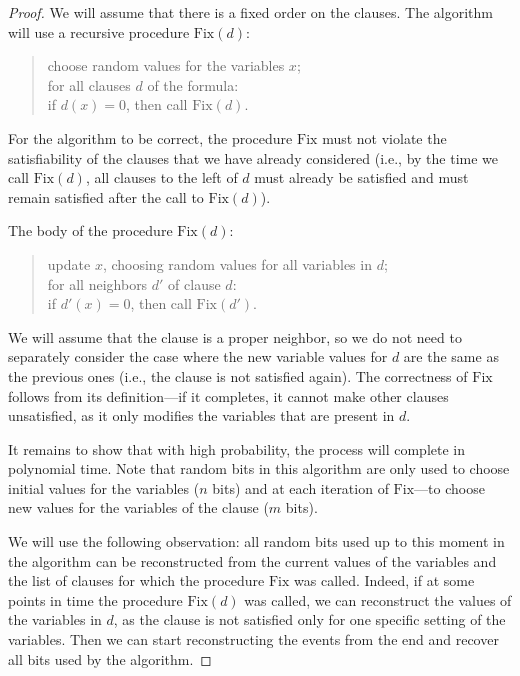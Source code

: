 \documentclass[12pt,sans]{article}
\theoremstyle{definition}
\theoremstyle{plain}
\theoremstyle{remark}
\begin{document}
\begin{proof} We will assume that there is a fixed order on the clauses.
    The algorithm will use a recursive procedure $\mathrm{Fix}(d)$:
    \begin{quote}
        choose random values for the variables $x$;\\
        for all clauses $d$ of the formula:\\
        \mbox{}\quad if $d(x) = 0$, then call $\mathrm{Fix}(d)$.
    \end{quote}
    For the algorithm to be correct, the procedure $\mathrm{Fix}$
    must not violate the satisfiability of the clauses that we have already considered
    (i.e., by the time we call $\mathrm{Fix}(d)$, all clauses to the left of $d$ must already
    be satisfied and must remain satisfied after the call to $\mathrm{Fix}(d)$).

    The body of the procedure $\mathrm{Fix}(d)$:
    \begin{quote}
        update $x$, choosing random values for all variables in $d$;\\
        for all neighbors $d'$ of clause $d$:\\
        \mbox{}\quad if $d'(x) = 0$, then call $\mathrm{Fix}(d')$.
    \end{quote}
    We will assume that the clause is a proper neighbor, so we do not need to
    separately consider the case where the new variable values for $d$
    are the same as the previous ones (i.e., the clause is not satisfied again).
    The correctness of $\mathrm{Fix}$ follows from its definition—if it completes,
    it cannot make other clauses unsatisfied, as it only modifies
    the variables that are present in $d$.

    It remains to show that with high probability, the process will complete in polynomial time.
    Note that random bits in this algorithm are only used to choose initial
    values for the variables ($n$ bits) and at each iteration of $\mathrm{Fix}$—to choose new
    values for the variables of the clause ($m$ bits).

    We will use the following observation: all random bits used up to this
    moment in the algorithm can be reconstructed from the current values of the variables and
    the list of clauses for which the procedure $\mathrm{Fix}$ was called. Indeed,
    if at some points in time the procedure $\mathrm{Fix}(d)$ was called,
    we can reconstruct the values of the variables in $d$, as the clause is not satisfied
    only for one specific setting of the variables. Then we can start reconstructing the events
    from the end and recover all bits used by the algorithm.


\end{proof}
\end{document}
